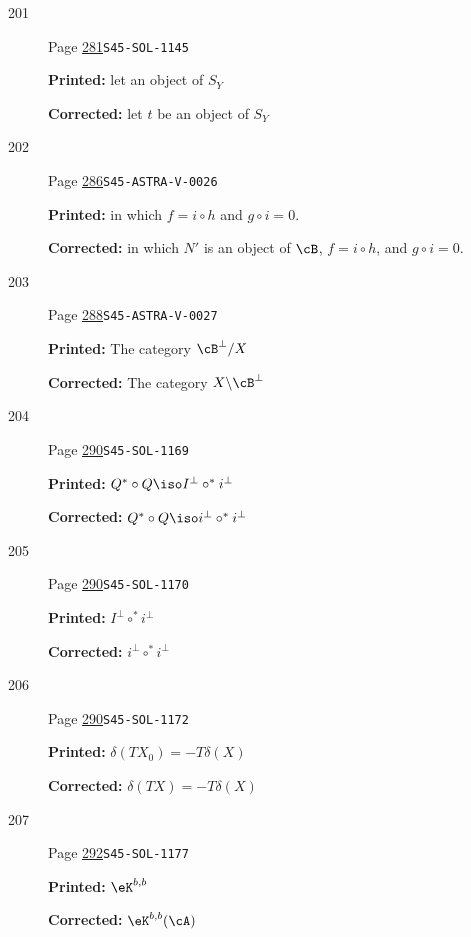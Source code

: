 \begin{description}
\item[\hypertarget{apparatus:EN-0201}{201}] Page \hyperlink{printpage:en:281}{281}\quad\texttt{S45-SOL-1145}
\par\noindent\textbf{Printed:} let an object
    of $S_Y$
\par\noindent\textbf{Corrected:} let $t$ be an object
    of $S_Y$
\smallskip
\item[\hypertarget{apparatus:EN-0202}{202}] Page \hyperlink{printpage:en:286}{286}\quad\texttt{S45-ASTRA-V-0026}
\par\noindent\textbf{Printed:} in which $f=i\circ h$ and $g\circ i=0$.
\par\noindent\textbf{Corrected:} in which $N'$ is an object of $\cB$, $f=i\circ h$, and $g\circ i=0$.
\smallskip
\item[\hypertarget{apparatus:EN-0203}{203}] Page \hyperlink{printpage:en:288}{288}\quad\texttt{S45-ASTRA-V-0027}
\par\noindent\textbf{Printed:} The category $\cB^\bot/X$
\par\noindent\textbf{Corrected:} The category $X\backslash\cB^\bot$
\smallskip
\item[\hypertarget{apparatus:EN-0204}{204}] Page \hyperlink{printpage:en:290}{290}\quad\texttt{S45-SOL-1169}
\par\noindent\textbf{Printed:} \(Q^\ast\circ Q\iso I^\bot\circ ^\ast i^\bot\)
\par\noindent\textbf{Corrected:} \(Q^\ast\circ Q\iso i^\bot\circ ^\ast i^\bot\)
\smallskip
\item[\hypertarget{apparatus:EN-0205}{205}] Page \hyperlink{printpage:en:290}{290}\quad\texttt{S45-SOL-1170}
\par\noindent\textbf{Printed:} \(I^\bot\circ ^\ast i^\bot\)
\par\noindent\textbf{Corrected:} \(i^\bot\circ ^\ast i^\bot\)
\smallskip
\item[\hypertarget{apparatus:EN-0206}{206}] Page \hyperlink{printpage:en:290}{290}\quad\texttt{S45-SOL-1172}
\par\noindent\textbf{Printed:} \(\delta(TX_0)=-T\delta(X)\)
\par\noindent\textbf{Corrected:} \(\delta(TX)=-T\delta(X)\)
\smallskip
\item[\hypertarget{apparatus:EN-0207}{207}] Page \hyperlink{printpage:en:292}{292}\quad\texttt{S45-SOL-1177}
\par\noindent\textbf{Printed:} \(\eK^{b,b}\)
\par\noindent\textbf{Corrected:} \(\eK^{b,b}(\cA)\)
\smallskip

\end{description}
